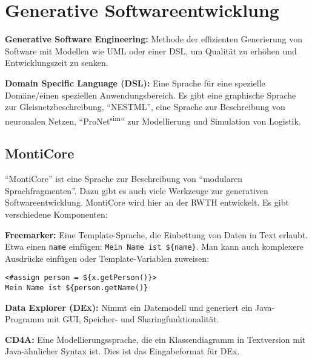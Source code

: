 \documentclass{panikzettel}
\begin{document}

\section{Generative Softwareentwicklung}
\label{sec:gensoft}

\textbf{Generative Software Engineering:} Methode der effizienten Generierung von Software mit Modellen wie UML oder einer DSL, um Qualität zu erhöhen und Entwicklungszeit zu senken.

\textbf{Domain Specific Language (DSL):} Eine Sprache für eine spezielle Domäne/einen speziellen Anwendungsbereich.
Es gibt eine graphische Sprache zur Gleisnetzbeschreibung, ``NESTML'', eine Sprache zur Beschreibung von neuronalen Netzen, ``ProNet\textsuperscript{sim}'' zur Modellierung und Simulation von Logistik.

\subsection{MontiCore}

``MontiCore'' ist eine Sprache zur Beschreibung von ``modularen Sprachfragmenten''.
Dazu gibt es auch viele Werkzeuge zur generativen Softwareentwicklung.
MontiCore wird hier an der RWTH entwickelt.
Es gibt verschiedene Komponenten:

\textbf{Freemarker:} Eine Template-Sprache, die Einbettung von Daten in Text erlaubt.
Etwa einen \lstinline{name} einfügen: \lstinline[mathescape=false]|Mein Name ist ${name}|.
Man kann auch komplexere Ausdrücke einfügen oder Template-Variablen zuweisen:
\begin{lstlisting}[mathescape=false]
<#assign person = ${x.getPerson()}>
Mein Name ist ${person.getName()}
\end{lstlisting}

\textbf{Data Explorer (DEx):} Nimmt ein Datemodell und generiert ein Java-Programm mit GUI, Speicher- und Sharingfunktionalität.

\textbf{CD4A:} Eine Modellierungssprache, die ein Klassendiagramm in Textversion mit Java-ähnlicher Syntax ist.
Dies ist das Eingabeformat für DEx.
\end{document}

